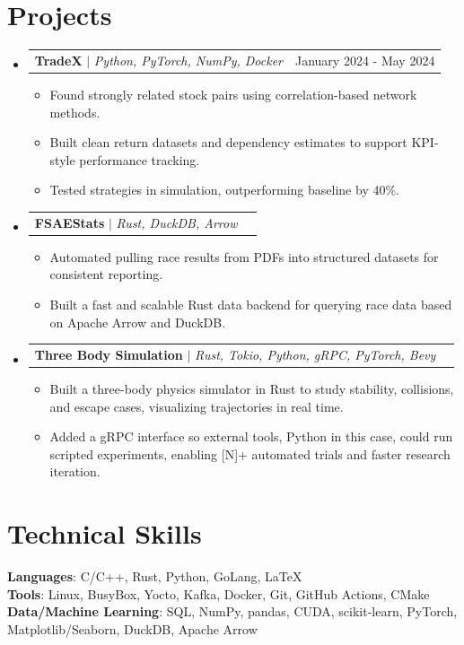 \documentclass[letterpaper,11pt]{article}
\makeatletter
\newcommand{\resumeItem}[1]{
  \item\small{
    {#1 \vspace{-2pt}}
  }
}
\newcommand{\resumeProjectHeading}[2]{
    \item
    \begin{tabular*}{0.97\textwidth}{l@{\extracolsep{\fill}}r}
      \small#1 & #2 \\
    \end{tabular*}\vspace{-7pt}
}
\newcommand{\resumeSubHeadingListStart}{\begin{itemize}[leftmargin=0.15in, label={}]}
\newcommand{\resumeSubHeadingListEnd}{\end{itemize}}
\newcommand{\resumeItemListStart}{\begin{itemize}}
\newcommand{\resumeItemListEnd}{\end{itemize}\vspace{-5pt}}
\makeatother
\begin{document}
\section{Projects}
    \resumeSubHeadingListStart
      \resumeProjectHeading
      {\textbf{TradeX} $|$ \emph{Python, PyTorch, NumPy, Docker}}{January 2024 - May 2024}
          \resumeItemListStart
          \resumeItem{Found strongly related stock pairs using correlation-based network methods.}
          \resumeItem{Built clean return datasets and dependency estimates to support KPI-style performance tracking.}
          \resumeItem{Tested strategies in simulation, outperforming baseline by 40\%.}
          \resumeItemListEnd
      \resumeProjectHeading
          {\textbf{FSAEStats} $|$ \emph{Rust, DuckDB, Arrow}}{}
          \resumeItemListStart
          \resumeItem{Automated pulling race results from PDFs into structured datasets for consistent reporting.}
          \resumeItem{Built a fast and scalable Rust data backend for querying race data based on Apache Arrow and DuckDB.}
          \resumeItemListEnd
                \resumeProjectHeading
          {\textbf{Three Body Simulation} $|$ \emph{Rust, Tokio, Python, gRPC, PyTorch, Bevy}}{}
          \resumeItemListStart
          \resumeItem{Built a three-body physics simulator in Rust to study stability, collisions, and escape cases, visualizing trajectories in real time.}
\resumeItem{Added a gRPC interface so external tools, Python in this case, could run scripted experiments, enabling [N]+ automated trials and faster research iteration.}

          \resumeItemListEnd

    \resumeSubHeadingListEnd
%
\section{Technical Skills}
 \begin{itemize}[leftmargin=0.15in, label={}]
    \small{\item{
     \textbf{Languages}{: C/C++, Rust, Python, GoLang, \LaTeX} \\
     \textbf{Tools}{: Linux, BusyBox, Yocto, Kafka, Docker, Git, GitHub Actions, CMake} \\
     \textbf{Data/Machine Learning}{: SQL, NumPy, pandas, CUDA, scikit-learn, PyTorch, Matplotlib/Seaborn, DuckDB, Apache Arrow}
    }}
 \end{itemize}

\end{document}
